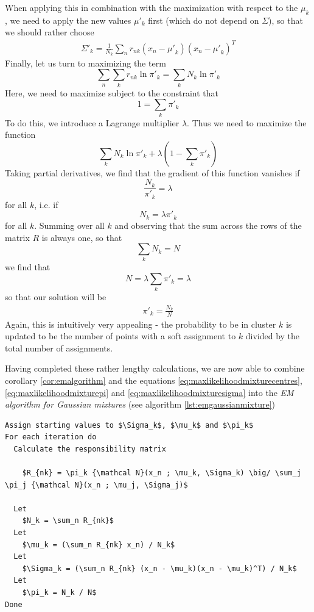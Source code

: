 \documentclass[a4paper, draft]{article}
\theoremstyle{own}
\theoremstyle{remark}
\begin{document}
When applying this in combination with the maximization with respect to the $\mu_k$, we need to apply the new values $\mu'_k$ first (which do not depend on $\Sigma$), so that we should rather choose
\begin{align}\label{eq:maxlikelihoodmixturesigma}
\Sigma'_k = \frac{1}{N_k} \sum_n r_{nk} (x_n - {\mu'}_k)(x_n - {\mu'}_k)^T
\end{align}
Finally, let us turn to maximizing the term
$$
\sum_n
\sum_k r_{nk} \ln \pi'_k = \sum_k N_k \ln \pi'_k
$$
Here, we need to maximize subject to the constraint that
$$
1 = \sum_k \pi'_k 
$$
To do this, we introduce a Lagrange multiplier $\lambda$. Thus we need to maximize the function
$$
\sum_k N_k \ln \pi'_k + \lambda (1 - \sum_k \pi'_k )
$$
Taking partial derivatives, we find that the gradient of this function vanishes if 
$$
\frac{N_k}{\pi'_k} = \lambda
$$
for all $k$, i.e. if
$$
N_k = \lambda \pi'_k
$$
for all $k$. 
Summing over all $k$ and observing that the sum across the rows of the matrix $R$ is always one, so that 
$$
\sum_k N_k = N
$$
we find that
$$
N = \lambda \sum_k \pi'_k = \lambda
$$
so that our solution will be
\begin{align}\label{eq:maxlikelihoodmixturepi}
\pi'_k = \frac{N_k}{N}
\end{align}
Again, this is intuitively very appealing - the probability to be in cluster $k$ is updated to be the number of points with a soft assignment to $k$ divided by the total number of assignments.

Having completed these rather lengthy calculations, we are now able to combine corollary \ref{cor:emalgorithm} and the equations \eqref{eq:maxlikelihoodmixturecentres}, \eqref{eq:maxlikelihoodmixturepi} and \eqref{eq:maxlikelihoodmixturesigma} into the {\em EM algorithm for Gaussian mixtures} (see algorithm \ref{lst:emgaussianmixture})


\begin{lstlisting}[mathescape=true,frame=single, label=lst:emgaussianmixture, float=ht,
captionpos=t, caption=EM algorithm for Gaussian mixture]
Assign starting values to $\Sigma_k$, $\mu_k$ and $\pi_k$ 
For each iteration do
  Calculate the responsibility matrix 
  
    $R_{nk} = \pi_k {\mathcal N}(x_n ; \mu_k, \Sigma_k) \big/ \sum_j \pi_j {\mathcal N}(x_n ; \mu_j, \Sigma_j)$
  
  Let 
    $N_k = \sum_n R_{nk}$ 
  Let 
    $\mu_k = (\sum_n R_{nk} x_n) / N_k$
  Let 
    $\Sigma_k = (\sum_n R_{nk} (x_n - \mu_k)(x_n - \mu_k)^T) / N_k$
  Let 
    $\pi_k = N_k / N$  
Done 
\end{lstlisting}
\end{document}
